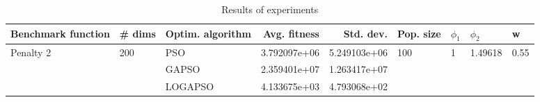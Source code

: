 \begin{table}
\centering
\caption{Results of experiments}
\begin{tabular}{lllrrllll}
\toprule
        Benchmark function &              \# dims & Optim. algorithm &  Avg. fitness &    Std. dev. &            Pop. size &         $\phi_{1}$ &               $\phi_{2}$ &                     w \\
\midrule
\multirow{3}{*}{Penalty 2} & \multirow{3}{*}{200} &              PSO &  3.792097e+06 & 5.249103e+06 & \multirow{3}{*}{100} & \multirow{3}{*}{1} & \multirow{3}{*}{1.49618} & \multirow{3}{*}{0.55} \\
                           &                      &            GAPSO &  2.359401e+07 & 1.263417e+07 &                      &                    &                          &                       \\
                           &                      &          LOGAPSO &  4.133675e+03 & 4.793068e+02 &                      &                    &                          &                       \\
\bottomrule
\end{tabular}
\end{table}
